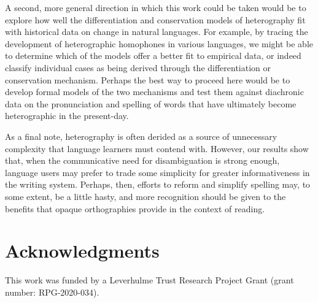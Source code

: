 \documentclass[doc,biblatex]{apa7}
\begin{document}
A second, more general direction in which this work could be taken would be to explore how well the differentiation and conservation models of heterography fit with historical data on change in natural languages. For example, by tracing the development of heterographic homophones in various languages, we might be able to determine which of the models offer a better fit to empirical data, or indeed classify individual cases as being derived through the differentiation or conservation mechanism. Perhaps the best way to proceed here would be to develop formal models of the two mechanisms and test them against diachronic data on the pronunciation and spelling of words that have ultimately become heterographic in the present-day.

As a final note, heterography is often derided as a source of unnecessary complexity that language learners must contend with. However, our results show that, when the communicative need for disambiguation is strong enough, language users may prefer to trade some simplicity for greater informativeness in the writing system. Perhaps, then, efforts to reform and simplify spelling may, to some extent, be a little hasty, and more recognition should be given to the benefits that opaque orthographies provide in the context of reading.


\section{Acknowledgments}

\noindent This work was funded by a Leverhulme Trust Research Project Grant (grant number: RPG-2020-034).

\printbibliography


\clearpage

\appendix

\section{}
\end{document}
